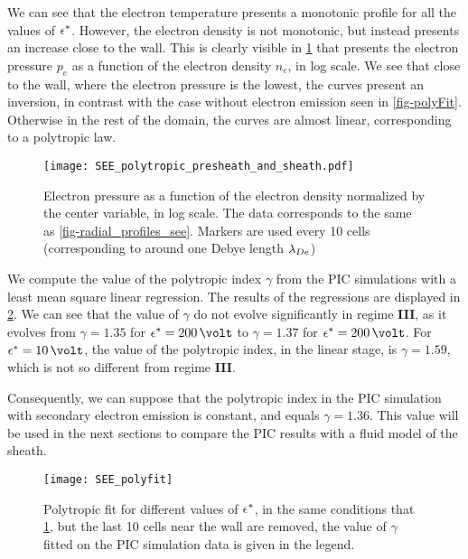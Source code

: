 We can see that the electron temperature presents a monotonic profile for all the values of $\epsilon^{*}$.
However, the electron density is not monotonic, but instead presents an increase close to the wall.
This is clearly visible in \cref{fig-log_pe-ne} that presents the electron pressure $p_e$ as a function of the electron density $n_e$, in log scale.
We see that close to the wall, where the electron pressure is the lowest, the curves present an inversion, in contrast with the case without electron emission seen in \cref{fig-polyFit}.
Otherwise in the rest of the domain, the curves are almost linear, corresponding to a polytropic law.

\begin{figure}[hbtp]
  \centering
  \texttt{[image: SEE\_polytropic\_presheath\_and\_sheath.pdf]}
  \caption{Electron pressure as a function of the electron density normalized by the center variable, in log scale. The data corresponds to the same as \cref{fig-radial_profiles_see}. Markers are used every 10 cells (corresponding to around one Debye length $\lambda_{De}$)}
  \label{fig-log_pe-ne}
\end{figure}

We compute the value of the polytropic index $\gamma$ from the \ac{PIC} simulations with a least mean square linear regression.
The results of the regressions are displayed in \cref{fig-polyfit_see}.
We can see that the value of $\gamma$ do not evolve significantly in regime {\bf III}, as it evolves from $\gamma=1.35$ for $\crover=200\,\volt$ to $\gamma=1.37$ for $\crover=200\,\volt$.
For $\crover=10\,\volt$, the value of the polytropic index, in the linear stage, is $\gamma=1.59$, which is not so different from regime {\bf III}.

Consequently, we can suppose that the polytropic index in the \ac{PIC} simulation with secondary electron emission is constant, and equals $\gamma=1.36$.
This value will be used in the next sections to compare the \ac{PIC} results with a fluid model of the sheath.

\renewcommand\subfigurewidth{3in}

\begin{figure}[hbtp]
  \centering
  \texttt{[image: SEE\_polyfit]}
  \caption{Polytropic fit for different values of $\epsilon^{*}$, in the same conditions that \cref{fig-log_pe-ne}, but the last 10 cells near the wall are removed, the value of $\gamma$ fitted on the \ac{PIC} simulation data is given in the legend.}
  \label{fig-polyfit_see}
\end{figure}


